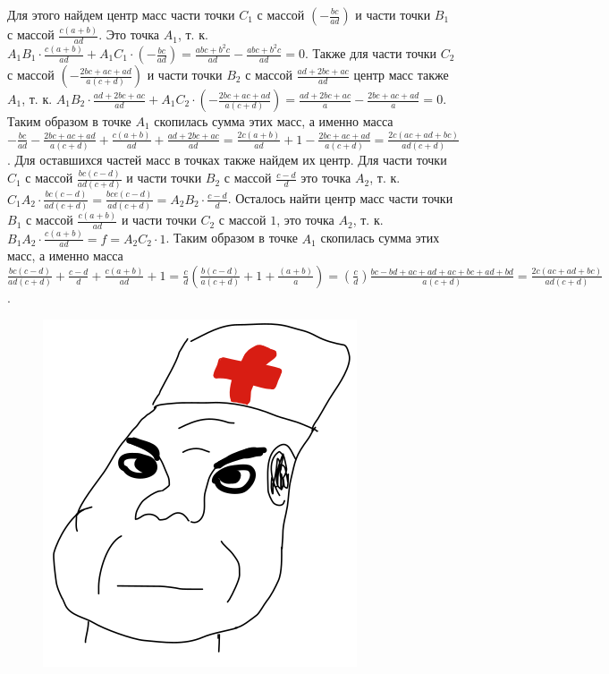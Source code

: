 Для этого найдем центр масс части точки $C_1$ с массой $(-\frac{bc}{ad})$ и части точки $B_1$ с массой $\frac{c(a+b)}{ad}$. Это точка $A_1$, т. к. $A_1B_1 \cdot \frac{c(a+b)}{ad} + A_1C_1 \cdot (-\frac{bc}{ad})= \frac{abc+b^2c}{ad} -\frac{abc + b^2c}{ad} = 0$. Также для части точки $C_2$ с массой $(-\frac{2bc+ac+ad}{a(c+d)})$ и части точки $B_2$ с массой $\frac{ad+2bc+ac}{ad}$ центр масс также $A_1$, т. к. $A_1B_2 \cdot \frac{ad+2bc+ac}{ad} + A_1C_2 \cdot (-\frac{2bc+ac+ad}{a(c+d)})= \frac{ad+2bc+ac}{a} -\frac{2bc+ac+ad}{a} = 0$. Таким образом в точке $A_1$ скопилась сумма этих масс, а именно масса $-\frac{bc}{ad}-\frac{2bc+ac+ad}{a(c+d)}+\frac{c(a+b)}{ad}+\frac{ad+2bc+ac}{ad}=\frac{2c(a+b)}{ad}+1-\frac{2bc+ac+ad}{a(c+d)}=\frac{2c(ac+ad+bc)}{ad(c+d)}$. Для оставшихся частей масс в точках также найдем их центр. Для части точки $C_1$ с массой $\frac{bc(c-d)}{ad(c+d)}$ и части точки $B_2$ с массой $\frac{c-d}{d}$ это точка $A_2$, т. к. $C_1A_2 \cdot \frac{bc(c-d)}{ad(c+d)} = \frac{bce(c-d)}{ad(c+d)} = A_2B_2 \cdot \frac{c-d}{d}$. Осталось найти центр масс части точки $B_1$ с массой $\frac{c(a+b)}{ad}$ и части точки $C_2$ с массой $1$, это точка $A_2$, т. к. $B_1A_2 \cdot \frac{c(a+b)}{ad} = f = A_2C_2 \cdot 1$. Таким образом в точке $A_1$ скопилась сумма этих масс, а именно масса $\frac{bc(c-d)}{ad(c+d)} + \frac{c-d}{d} + \frac{c(a+b)}{ad} + 1 = \frac{c}{d}(\frac{b(c-d)}{a(c+d)} + 1 + \frac{(a+b)}{a}) = (\frac{c}{d})\frac{bc-bd+ac+ad+ac+bc+ad+bd}{a(c+d)} = \frac{2c(ac+ad+bc)}{ad(c+d)}$. 

\begin{figure}
\includegraphics[width=\linewidth]{tasks/SXKj17wSmm.png}
\end{figure}

